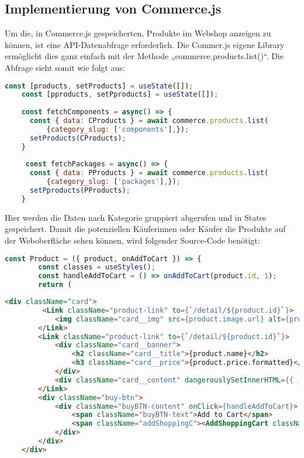 \subsection{Implementierung von Commerce.js}

Um die, in Commerce.js gespeicherten, Produkte im Webshop anzeigen zu können, ist eine API-Datenabfrage erforderlich. Die Commer.js eigene Library ermöglicht dies ganz einfach mit der Methode „commerce.products.list()“. Die Abfrage sieht somit wie folgt aus: 

\begin{lstlisting}[language=JavaScript, caption=Abfrage der Produkte, label=lst:impl:commerce]
    const [products, setProducts] = useState([]);
    const [pproducts, setPproducts] = useState([]);
    
    const fetchComponents = async() => {
      const { data: CProducts } = await commerce.products.list(
          {category_slug: ['components'],});
      setProducts(CProducts);
    }
  
     const fetchPackages = async() => {
      const { data: PProducts } = await commerce.products.list(
          {category_slug: ['packages'],});
      setPproducts(PProducts);
    }
\end{lstlisting}

Hier werden die Daten nach Kategorie gruppiert abgerufen und in States gespeichert. Damit die potenziellen Käuferinnen oder Käufer die Produkte auf der Weboberfläche sehen können, wird folgender Source-Code benötigt: \\
\begin{lstlisting}[language=JavaScript, caption={components.js}]
    const Product = ({ product, onAddToCart }) => {
        const classes = useStyles();
        const handleAddToCart = () => onAddToCart(product.id, 1);
        return (
\end{lstlisting}


\begin{lstlisting}[language=HTML, caption={components.html}]
    <div className="card">
         <Link className="product-link" to={`/detail/${product.id}`}>
            <img className="card__img" src={product.image.url} alt={product.name} />
        </Link>
        <Link className="product-link" to={`/detail/${product.id}`}>
            <div className="card__banner">
                <h2 className="card__title">{product.name}</h2>
                <h3 className="card__price">{product.price.formatted}</h3>
            </div>
            <div className="card__content" dangerouslySetInnerHTML={{ __html: product.description }} />
        </Link>
        <div className="buy-btn">
            <div className="buyBTN-content" onClick={handleAddToCart}>
                <span className="buyBTN-text">Add to Cart</span>
                <span className="addShoppingC"><AddShoppingCart className={classes.ascIcon} /></span>
            </div>
        </div>
    </div>
\end{lstlisting}

